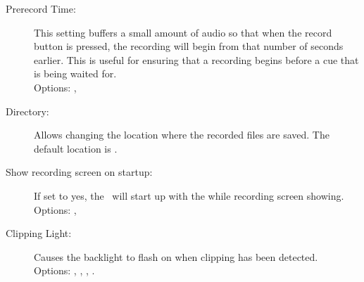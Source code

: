 \begin{description}
    \item[Prerecord Time:]
      This setting buffers a small amount of audio so that when the record button
      is pressed, the recording will begin from that number of seconds earlier.
      This is useful for ensuring that a recording begins before a cue that is
      being waited for.\\
      Options: , 
      
    \item[Directory:]
      Allows changing the location where the recorded files are saved. The
      default location is .
      
    \item[Show recording screen on startup:]
      If set to yes, the \dap\ will start up with the while recording screen
      showing.\\
      Options: , 
      
    \item[Clipping Light:]
      Causes the backlight to flash on when clipping has been detected.\\
      Options: , ,
      , .
      
      
\end{description}
